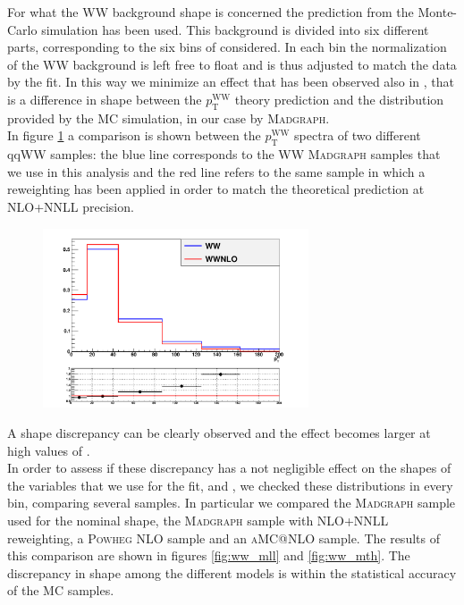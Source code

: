 For what the WW background shape is concerned the prediction from the Monte-Carlo simulation has been used.
This background is divided into six different parts, corresponding to the six bins of \pth considered. In each bin the normalization of the WW background is left free to float and is thus adjusted to match the data by the fit. In this way we minimize an effect that has been observed also in \cite{CMS_AN_2014_056}, that is a difference in shape between the $p_\mathrm{T}^\mathrm{WW}$ theory prediction and the distribution provided by the MC simulation, in our case by \textsc{Madgraph}.\\
In figure \ref{fig:ww_wwnlo} a comparison is shown between the $p_\mathrm{T}^\mathrm{WW}$ spectra of two different qqWW samples: the blue line corresponds to the WW \textsc{Madgraph} samples that we use in this analysis and the red line refers to the same sample in which a reweighting has been applied in order to match the theoretical prediction at NLO+NNLL precision. 
\begin{figure}[b]
\centering
\includegraphics[width=0.7\textwidth]{images/WWnlo/WW_WWnlo.pdf}
\caption{}\label{fig:ww_wwnlo}
\end{figure}
A shape discrepancy can be clearly observed and the effect becomes larger at high values of \pth.\\
In order to assess if these discrepancy has a not negligible effect on the shapes of the variables that we use for the fit, \mll and \mt, we checked these distributions in every \pth bin, comparing several samples. In particular we compared the \textsc{Madgraph} sample used for the nominal shape, the \textsc{Madgraph} sample with NLO+NNLL  reweighting, a \textsc{Powheg} NLO sample and an \textsc{aMC@NLO} sample.
The results of this comparison are shown in figures \ref{fig:ww_mll} and \ref{fig:ww_mth}. The discrepancy in shape among the different models is within the statistical accuracy of the MC samples. 

